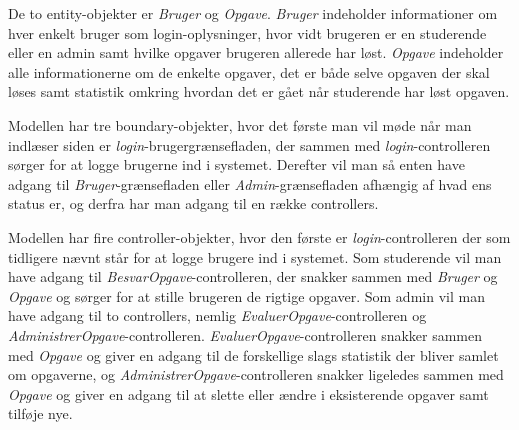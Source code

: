 \documentclass[11pt, a4paper]{article}
\begin{document}
De to entity-objekter er \emph{Bruger} og \emph{Opgave}. \emph{Bruger} indeholder informationer om hver enkelt bruger som login-oplysninger, hvor vidt brugeren er en studerende eller en admin samt hvilke opgaver brugeren allerede har løst. \emph{Opgave} indeholder alle informationerne om de enkelte opgaver, det er både selve opgaven der skal løses samt statistik omkring hvordan det er gået når studerende har løst opgaven.

Modellen har tre boundary-objekter, hvor det første man vil møde når man indlæser siden er \textit{login}-brugergrænsefladen, der sammen med \emph{login}-controlleren sørger for at logge brugerne ind i systemet. Derefter vil man så enten have adgang til \emph{Bruger}-grænsefladen eller \emph{Admin}-grænsefladen afhængig af hvad ens status er, og derfra har man adgang til en række controllers.

Modellen har fire controller-objekter, hvor den første er \emph{login}-controlleren der som tidligere nævnt står for at logge brugere ind i systemet. Som studerende vil man have adgang til \emph{BesvarOpgave}-controlleren, der snakker sammen med \emph{Bruger} og \emph{Opgave} og sørger for at stille brugeren de rigtige opgaver. Som admin vil man have adgang til to controllers, nemlig \emph{EvaluerOpgave}-controlleren og \emph{AdministrerOpgave}-controlleren. \emph{EvaluerOpgave}-controlleren snakker sammen med \emph{Opgave} og giver en adgang til de forskellige slags statistik der bliver samlet om opgaverne, og \emph{AdministrerOpgave}-controlleren snakker ligeledes sammen med \emph{Opgave} og giver en adgang til at slette eller ændre i eksisterende opgaver samt tilføje nye.
\end{document}
